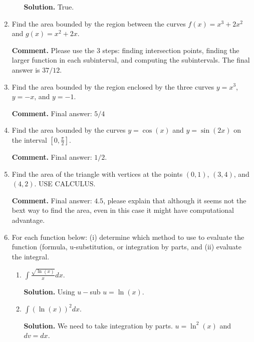 \documentclass[12pt]{article}
\begin{document}
\begin{enumerate}
\begin{enumerate}
\textbf{Solution. } True. 

\end{enumerate}

\item Find the area bounded by the region between the curves $f(x) = x^3 + 2x^2$ and $g(x) =
x^2 + 2x$.

\textbf{Comment. } Please use the 3 steps: finding intersection points, finding the larger function in each subinterval, and computing the subintervals. The final answer is $37/12$.

\item Find the area bounded by the region enclosed by the three curves $y = x^3$, $y = -x$, and
$y = -1$.

\textbf{Comment. } Final answer: $5/4$

\item Find the area bounded by the curves $y = \cos(x)$ and $y = \sin(2x)$ on the interval $[0,\frac{\pi}{2}]$.

\textbf{Comment. } Final answer: $1/2$.

\item Find the area of the triangle with vertices at the points $(0,1)$, $(3,4)$, and $(4,2)$. USE
CALCULUS.

\textbf{Comment. } Final answer: $4.5$, please explain that although it seems not the bext way to find the area, even in this case it might have computational advantage. 

\item For each function below: (i) determine which method to use to evaluate the function
(formula, u-substitution, or integration by parts, and (ii) evaluate the integral.
\begin{enumerate}
\item $\int \frac{\sqrt{\ln(x)}}{x}dx$.

\textbf{Solution. } Using $u-$sub $u=\ln(x)$.

\item $\int \left(\ln(x)\right)^2dx$.

\textbf{Solution. } We need to take integration by parts. $u=\ln^2(x)$ and $dv=dx$.
\end{enumerate}


\end{enumerate}
\end{document}
